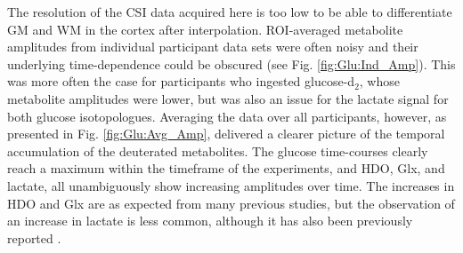
The resolution of the \ac{CSI} data acquired here is too low to be able to differentiate \ac{GM} and \ac{WM} in the cortex after interpolation. \ac{ROI}-averaged metabolite amplitudes from individual participant data sets were often noisy and their underlying time-dependence could be obscured (see Fig. \ref{fig:Glu:Ind_Amp}). This was more often the case for participants who ingested glucose-d$_2$, whose metabolite amplitudes were lower, but was also an issue for the lactate signal for both glucose isotopologues. Averaging the data over all participants, however, as presented in Fig. \ref{fig:Glu:Avg_Amp}, delivered a clearer picture of the temporal accumulation of the deuterated metabolites. The glucose time-courses clearly reach a maximum within the timeframe of the experiments, and \ac{HDO}, Glx, and lactate, all unambiguously show increasing amplitudes over time. The increases in \ac{HDO} and Glx are as expected from many previous studies, but the observation of an increase in lactate is less common, although it has also been previously reported \cite{Ruhm2021DeuteriumResolution, Kaggie2022DeuteriumMetabolism}. 


